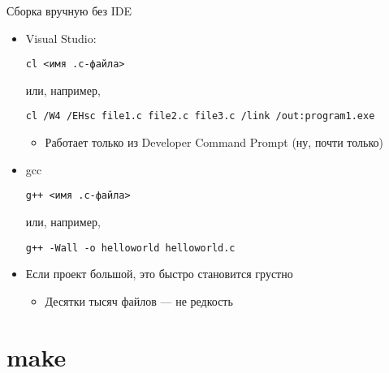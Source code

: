 \documentclass{../../slides-style}
\begin{document}
    \begin{frame}[fragile]{Сборка вручную без IDE}
        \begin{itemize}
            \item Visual Studio:
            \begin{footnotesize}
                \begin{verbatim}
cl <имя .c-файла>
                \end{verbatim}
            \end{footnotesize}
            или, например,
            \begin{footnotesize}
                \begin{verbatim}
cl /W4 /EHsc file1.c file2.c file3.c /link /out:program1.exe
                \end{verbatim}
            \end{footnotesize}
            \begin{itemize}
                \item Работает только из Developer Command Prompt (ну, почти только)
            \end{itemize}
            \item gcc
            \begin{footnotesize}
                \begin{verbatim}
g++ <имя .c-файла>
                \end{verbatim}
            \end{footnotesize}
            или, например,
            \begin{footnotesize}
                \begin{verbatim}
g++ -Wall -o helloworld helloworld.c
                \end{verbatim}
            \end{footnotesize}
            \item Если проект большой, это быстро становится грустно
            \begin{itemize}
                \item Десятки тысяч файлов --- не редкость
            \end{itemize}
        \end{itemize}
    \end{frame}

    \section{make}
\end{document}
